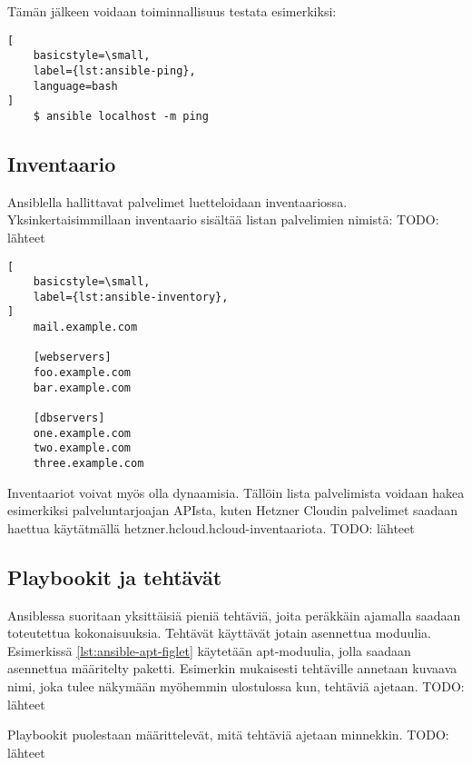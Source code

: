 Tämän jälkeen voidaan toiminnallisuus testata esimerkiksi:

\begin{lstlisting}[
    basicstyle=\small,
    label={lst:ansible-ping},
    language=bash
]
    $ ansible localhost -m ping
\end{lstlisting}

\subsection{Inventaario}

Ansiblella hallittavat palvelimet luetteloidaan inventaariossa.
Yksinkertaisimmillaan inventaario sisältää listan palvelimien nimistä:
TODO: lähteet

\begin{lstlisting}[
    basicstyle=\small,
    label={lst:ansible-inventory},
]
    mail.example.com

    [webservers]
    foo.example.com
    bar.example.com

    [dbservers]
    one.example.com
    two.example.com
    three.example.com
\end{lstlisting}

Inventaariot voivat myös olla dynaamisia. Tällöin lista palvelimista
voidaan hakea esimerkiksi palveluntarjoajan APIsta, kuten Hetzner Cloudin
palvelimet saadaan haettua käytätmällä hetzner.hcloud.hcloud-inventaariota.
TODO: lähteet

\subsection{Playbookit ja tehtävät}

Ansiblessa suoritaan yksittäisiä pieniä tehtäviä, joita peräkkäin ajamalla
saadaan toteutettua kokonaisuuksia. Tehtävät käyttävät jotain asennettua
moduulia. Esimerkissä \ref{lst:ansible-apt-figlet} käytetään apt-moduulia,
jolla saadaan asennettua määritelty paketti. Esimerkin mukaisesti tehtäville
annetaan kuvaava nimi, joka tulee näkymään myöhemmin ulostulossa kun,
tehtäviä ajetaan.
TODO: lähteet



Playbookit puolestaan määrittelevät, mitä tehtäviä ajetaan minnekkin.
TODO: lähteet



